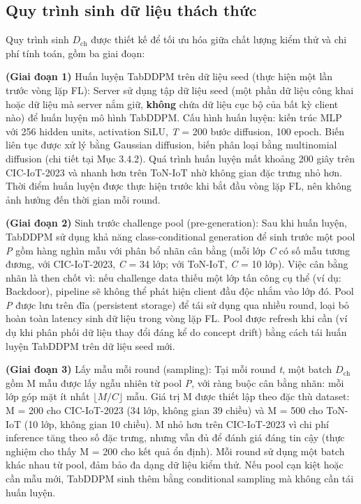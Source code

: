 \subsection{Quy trình sinh dữ liệu thách thức}
Quy trình sinh $D_{\text{ch}}$ được thiết kế để tối ưu hóa giữa chất lượng kiểm thử và chi phí tính toán, gồm ba giai đoạn:

\textbf{(Giai đoạn 1)} Huấn luyện TabDDPM trên dữ liệu seed (thực hiện một lần trước vòng lặp FL): Server sử dụng tập dữ liệu seed (một phần dữ liệu công khai hoặc dữ liệu mà server nắm giữ, \textbf{không} chứa dữ liệu cục bộ của bất kỳ client nào) để huấn luyện mô hình TabDDPM. Cấu hình huấn luyện: kiến trúc MLP với 256 hidden units, activation SiLU, \emph{T} = 200 bước diffusion, 100 epoch. Biến liên tục được xử lý bằng Gaussian diffusion, biến phân loại bằng multinomial diffusion (chi tiết tại Mục 3.4.2). Quá trình huấn luyện mất khoảng 200 giây trên CIC-IoT-2023 và nhanh hơn trên ToN-IoT nhờ không gian đặc trưng nhỏ hơn. Thời điểm huấn luyện được thực hiện trước khi bắt đầu vòng lặp FL, nên không ảnh hưởng đến thời gian mỗi round.

\textbf{(Giai đoạn 2)} Sinh trước challenge pool (pre-generation): Sau khi huấn luyện, TabDDPM sử dụng khả năng class-conditional generation để sinh trước một pool \emph{P} gồm hàng nghìn mẫu với phân bổ nhãn cân bằng (mỗi lớp \emph{C} có số mẫu tương đương, với CIC-IoT-2023, \emph{C} = 34 lớp; với ToN-IoT, \emph{C} = 10 lớp). Việc cân bằng nhãn là then chốt vì: nếu challenge data thiếu một lớp tấn công cụ thể (ví dụ: Backdoor), pipeline sẽ không thể phát hiện client đầu độc nhắm vào lớp đó. Pool \emph{P} được lưu trên đĩa (persistent storage) để tái sử dụng qua nhiều round, loại bỏ hoàn toàn latency sinh dữ liệu trong vòng lặp FL. Pool được refresh khi cần (ví dụ khi phân phối dữ liệu thay đổi đáng kể do concept drift) bằng cách tái huấn luyện TabDDPM trên dữ liệu seed mới.

\textbf{(Giai đoạn 3)} Lấy mẫu mỗi round (sampling): Tại mỗi round \emph{t}, một batch $D_{\text{ch}}$ gồm M mẫu được lấy ngẫu nhiên từ pool \emph{P}, với ràng buộc cân bằng nhãn: mỗi lớp góp mặt ít nhất $\lfloor M/C \rfloor$ mẫu. Giá trị M được thiết lập theo đặc thù dataset: M = 200 cho CIC-IoT-2023 (34 lớp, không gian 39 chiều) và M = 500 cho ToN-IoT (10 lớp, không gian 10 chiều). M nhỏ hơn trên CIC-IoT-2023 vì chi phí inference tăng theo số đặc trưng, nhưng vẫn đủ để đánh giá đáng tin cậy (thực nghiệm cho thấy M = 200 cho kết quả ổn định). Mỗi round sử dụng một batch khác nhau từ pool, đảm bảo đa dạng dữ liệu kiểm thử. Nếu pool cạn kiệt hoặc cần mẫu mới, TabDDPM sinh thêm bằng conditional sampling mà không cần tái huấn luyện.

